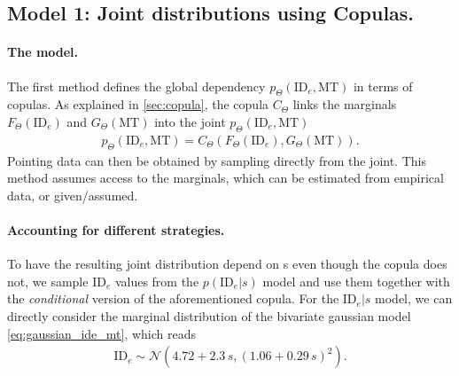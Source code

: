 \documentclass[acmlarge, manuscript,review]{acmart}
\newcommand{\mt}{\ensuremath{{\text{MT}}}\xspace}
\newcommand{\ide}{\ensuremath{{\text{ID}_e}}\xspace}
\begin{document}
\subsection{Model 1: Joint distributions using Copulas.}

\paragraph{The model.} The first method defines the global dependency $p_{\Theta}(\ide, \mt)$ in terms of copulas. As explained in \autoref{sec:copula}, the copula $C_{\Theta}$ links the marginals $F_{\Theta}(\ide)$ and $G_{\Theta}(\mt)$ into the joint $p_{\Theta}(\ide, \mt)$
\begin{align}
	p_{\Theta}(\ide, \mt) = C_{\Theta}(F_{\Theta}(\ide), G_{\Theta}(\mt)).
\end{align}
Pointing data can then be obtained by sampling directly from the joint. This method assumes access to the marginals, which can be estimated from empirical data, or given/assumed.

\paragraph{Accounting for different strategies.} To have the resulting joint distribution depend on s even though the copula does not, we sample \ide values from the $p(\ide | s)$ model and use them together with the \textit{conditional} version of the aforementioned copula.
For the $\ide|s$ model, we can directly consider the marginal distribution of the bivariate gaussian model \autoref{eq:gaussian_ide_mt}, which reads
\begin{align}
	\ide \sim \mathcal{N}(4.72 + 2.3\,s, (1.06 + 0.29\,s)^2). \label{eq:gauss_strategy_marginal}
\end{align}
\end{document}
